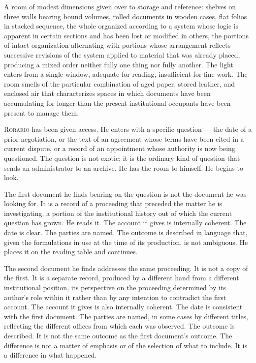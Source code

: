 \documentclass[12pt, oneside]{article}
\newenvironment{action}{%
  \vspace{0.6em}%
  \noindent\ignorespaces%
}{%
  \par\vspace{0.6em}%
}
\begin{document}
\begin{action}
A room of modest dimensions given over to storage and reference: shelves on three walls bearing bound volumes, rolled documents in wooden cases, flat folios in stacked sequence, the whole organized according to a system whose logic is apparent in certain sections and has been lost or modified in others, the portions of intact organization alternating with portions whose arrangement reflects successive revisions of the system applied to material that was already placed, producing a mixed order neither fully one thing nor fully another. The light enters from a single window, adequate for reading, insufficient for fine work. The room smells of the particular combination of aged paper, stored leather, and enclosed air that characterizes spaces in which documents have been accumulating for longer than the present institutional occupants have been present to manage them.

\textsc{Rorario} has been given access. He enters with a specific question --- the date of a prior negotiation, or the text of an agreement whose terms have been cited in a current dispute, or a record of an appointment whose authority is now being questioned. The question is not exotic; it is the ordinary kind of question that sends an administrator to an archive. He has the room to himself. He begins to look.
\end{action}

\begin{action}
The first document he finds bearing on the question is not the document he was looking for. It is a record of a proceeding that preceded the matter he is investigating, a portion of the institutional history out of which the current question has grown. He reads it. The account it gives is internally coherent. The date is clear. The parties are named. The outcome is described in language that, given the formulations in use at the time of its production, is not ambiguous. He places it on the reading table and continues.

The second document he finds addresses the same proceeding. It is not a copy of the first. It is a separate record, produced by a different hand from a different institutional position, its perspective on the proceeding determined by its author's role within it rather than by any intention to contradict the first account. The account it gives is also internally coherent. The date is consistent with the first document. The parties are named, in some cases by different titles, reflecting the different offices from which each was observed. The outcome is described. It is not the same outcome as the first document's outcome. The difference is not a matter of emphasis or of the selection of what to include. It is a difference in what happened.
\end{action}
\end{document}
